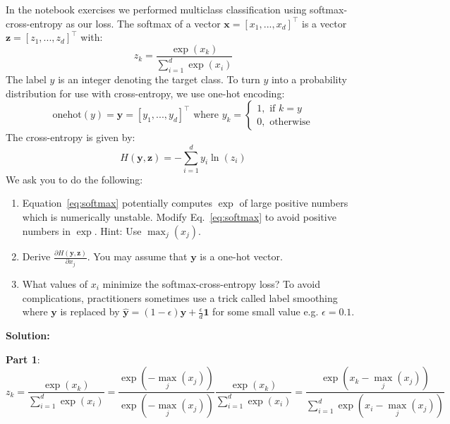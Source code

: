 \documentclass{./../../tex_import/ETHuebung_english}
\begin{document}
\vspace{-1.5em}
In the notebook exercises we performed multiclass classification using softmax-cross-entropy as our loss.
The softmax of a vector $\mathbf{x}=[x_1,...,x_d]^\top$ is a vector $\mathbf{z}=[z_1,...,z_d]^\top$ with:
\begin{equation} \label{eq:softmax}
z_k = \frac{\exp(x_k)}{\sum_{i=1}^{d} \exp(x_i)}
\end{equation}
The label $y$ is an integer denoting the target class.
To turn $y$ into a probability distribution for use with cross-entropy, we use one-hot encoding:
\begin{equation}
\text{onehot}(y)=\mathbf{y}=[y_1,...,y_d]^\top \text{ where } y_k=
\begin{cases}
1, \text{ if } k=y \\
0, \text{ otherwise}
\end{cases}
\end{equation}
The cross-entropy is given by:
\begin{equation}
H(\mathbf{y}, \mathbf{z}) = - \sum_{i=1}^{d} y_i \ln(z_i)
\end{equation}
We ask you to do the following:
\begin{enumerate}
	\item Equation~\ref{eq:softmax} potentially computes $\exp$ of large positive numbers which is numerically unstable. Modify Eq.~\ref{eq:softmax} to avoid positive numbers in $\exp$. Hint: Use $\max_j(x_j)$.
	\item Derive $\frac{\partial H(\mathbf{y}, \mathbf{z})}{\partial x_j}$. You may assume that $\mathbf{y}$ is a one-hot vector.
	\item What values of $x_i$ minimize the softmax-cross-entropy loss? To avoid complications, practitioners sometimes use a trick called label smoothing where $\mathbf{y}$ is replaced by $\hat{\mathbf{y}} = (1-\epsilon)\mathbf{y} + \frac{\epsilon}{d} \mathbf{1}$ for some small value e.g. $\epsilon=0.1$.
\end{enumerate}

\textbf{Solution:}

\vspace{1em}
\textbf{Part 1}:
\begin{equation}
z_k = \frac{\exp(x_k)}{\sum_{i=1}^{d} \exp(x_i)} = \frac{\exp(-\max_j(x_j))}{\exp(-\max_j(x_j))} \frac{\exp(x_k)}{\sum_{i=1}^{d} \exp(x_i)} = \frac{\exp(x_k-\max_j(x_j))}{\sum_{i=1}^{d} \exp(x_i-\max_j(x_j))}
\end{equation}
\end{document}
